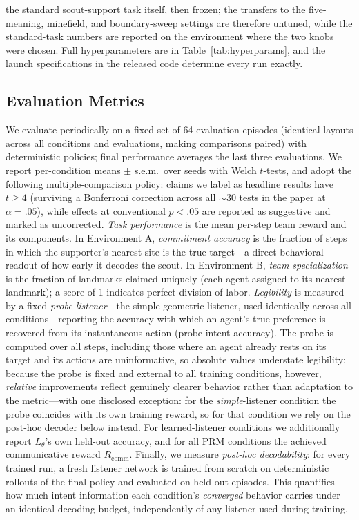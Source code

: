 \documentclass{article}
\newcommand{\Rcomm}{R_{\text{comm}}}
\newcommand{\Ltheta}{L_\theta}
\begin{document}
the standard scout-support task itself, then frozen; the transfers to the five-meaning, minefield, and boundary-sweep settings are therefore untuned, while the standard-task numbers are reported on the environment where the two knobs were chosen. Full hyperparameters are in Table~\ref{tab:hyperparams}, and the launch specifications in the released code determine every run exactly.

\subsection{Evaluation Metrics}
\label{ssec:metrics}

We evaluate periodically on a fixed set of 64 evaluation episodes (identical layouts across all conditions and evaluations, making comparisons paired) with deterministic policies; final performance averages the last three evaluations. We report per-condition means $\pm$ s.e.m.\ over seeds with Welch $t$-tests, and adopt the following multiple-comparison policy: claims we label as headline results have $t \geq 4$ (surviving a Bonferroni correction across all ${\sim}30$ tests in the paper at $\alpha=.05$), while effects at conventional $p<.05$ are reported as suggestive and marked as uncorrected. \emph{Task performance} is the mean per-step team reward and its components. In Environment A, \emph{commitment accuracy} is the fraction of steps in which the supporter's nearest site is the true target---a direct behavioral readout of how early it decodes the scout. In Environment B, \emph{team specialization} is the fraction of landmarks claimed uniquely (each agent assigned to its nearest landmark); a score of 1 indicates perfect division of labor. \emph{Legibility} is measured by a fixed \emph{probe listener}---the simple geometric listener, used identically across all conditions---reporting the accuracy with which an agent's true preference is recovered from its instantaneous action (probe intent accuracy). The probe is computed over all steps, including those where an agent already rests on its target and its actions are uninformative, so absolute values understate legibility; because the probe is fixed and external to all training conditions, however, \emph{relative} improvements reflect genuinely clearer behavior rather than adaptation to the metric---with one disclosed exception: for the \emph{simple}-listener condition the probe coincides with its own training reward, so for that condition we rely on the post-hoc decoder below instead. For learned-listener conditions we additionally report $\Ltheta$'s own held-out accuracy, and for all PRM conditions the achieved communicative reward $\Rcomm$. Finally, we measure \emph{post-hoc decodability}: for every trained run, a fresh listener network is trained from scratch on deterministic rollouts of the final policy and evaluated on held-out episodes. This quantifies how much intent information each condition's \emph{converged} behavior carries under an identical decoding budget, independently of any listener used during training.
\end{document}
